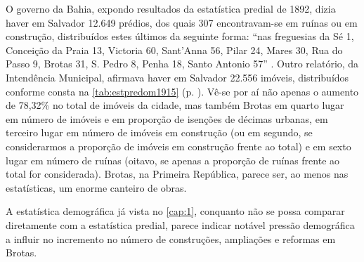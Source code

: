 O governo da Bahia, expondo resultados da estatística predial de 1892, dizia haver em Salvador 12.649 prédios, dos quais 307 encontravam-se em ruínas ou em construção, distribuídos estes últimos da seguinte forma: ``nas freguesias da Sé 1, Conceição da Praia 13, Victoria 60, Sant'Anna 56, Pilar 24, Mares 30, Rua do Passo 9, Brotas 31, S. Pedro 8, Penha 18, Santo Antonio 57'' \cite[relatório da inspetoria de higiene, p.~6]{bahia_rpe_1893}. Outro relatório, da Intendência Municipal, afirmava haver em Salvador 22.556
imóveis, distribuídos conforme consta na \autoref{tab:estpredom1915} (p. \pageref{tab:estpredom1915}). Vê-se por aí não apenas o aumento de 78,32\% no total de imóveis da cidade, mas também Brotas em quarto lugar em número de imóveis e em proporção de isenções de décimas urbanas, em terceiro lugar em número de imóveis em construção (ou em segundo, se considerarmos a proporção de imóveis em construção frente ao total) e em sexto lugar em número de ruínas (oitavo, se apenas a proporção de ruínas frente ao total for considerada). Brotas, na Primeira República, parece ser, ao menos nas estatísticas, um enorme canteiro de obras.



A estatística demográfica já vista no \autoref{cap:1}, conquanto não se possa comparar diretamente com a estatística predial, parece indicar notável pressão demográfica a influir no incremento no número de construções, ampliações e reformas em Brotas. 

